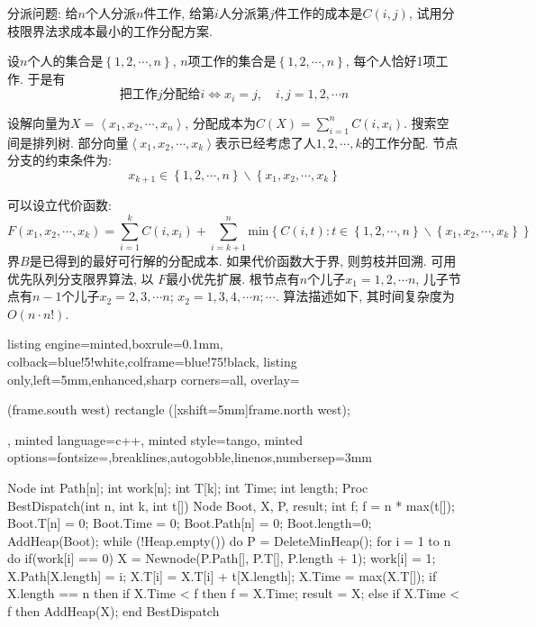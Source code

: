 \documentclass{article}
\begin{document}
\begin{homeworkProblem}
	分派问题: 给$n$个人分派$n$件工作, 给第$i$人分派第$j$件工作的成本是$C(i,j)$, 试用分枝限界法求成本最小的工作分配方案.

	\solution 设$n$个人的集合是$\left\{ 1,2,\cdots,n \right\}$, $n$项工作的集合是$\left\{ 1,2,\cdots,n \right\}$, 每个人恰好1项工作. 于是有
	$$\text{把工作}j\text{分配给}i\Leftrightarrow x_i=j,\quad i,j=1,2,\cdots n
	$$

	设解向量为$X=\left< x_1,x_2,\cdots ,x_n \right>	$, 分配成本为$\displaystyle C\left( X \right) =\sum_{i=1}^n{C\left( i,x_i \right)}	$. 搜索空间是排列树. 部分向量$\left< x_1,x_2,\cdots ,x_k \right> $表示已经考虑了人$1,2,\cdots,k$的工作分配. 节点分支的约束条件为:$$x_{k+1}\in \left\{ 1,2,\cdots ,n \right\} \backslash \left\{ x_1,x_2,\cdots ,x_k \right\} 
	$$

	可以设立代价函数:$$F\left( x_1,x_2,\cdots ,x_k \right) =\sum_{i=1}^k{C\left( i,x_i \right)}+\sum_{i=k+1}^n{\text{min} \left\{ C\left( i,t \right) :t\in \left\{ 1,2,\cdots ,n \right\} \backslash \left\{ x_1,x_2,\cdots ,x_k \right\} \right\}}
	$$
	界$B$是已得到的最好可行解的分配成本. 如果代价函数大于界, 则剪枝并回溯. 可用优先队列分支限界算法, 以
	$F$最小优先扩展. 根节点有$n$个儿子$x_1=1,2,\cdots n$, 儿子节点有$n-1$个儿子$x_2=2,3,\cdots n$; $x_2=1,3,4,\cdots n;\cdots $. 算法描述如下, 其时间复杂度为$O(n\cdot n!)$.
\begin{tcblisting}{listing engine=minted,boxrule=0.1mm,
colback=blue!5!white,colframe=blue!75!black,
listing only,left=5mm,enhanced,sharp corners=all,
overlay={\begin{tcbclipinterior} (frame.south west)
rectangle ([xshift=5mm]frame.north west);\end{tcbclipinterior}},
minted language=c++,
minted style=tango,
minted options={fontsize=\small,breaklines,autogobble,linenos,numbersep=3mm}}
Node{
    int Path[n];
    int work[n];
    int T[k];
    int Time;
    int length;
}
Proc BestDispatch(int n, int k, int t[]){
    Node Boot, X, P, result;
    int f;
    f = n * max(t[]);
    Boot.T[n] = {0};
    Boot.Time = 0;
    Boot.Path[n] = {0};
    Boot.length=0;
    AddHeap(Boot);
    while (!Heap.empty()) do {
        P = DeleteMinHeap();
        for i = 1 to n do {
            if(work[i] == 0) {
                X = Newnode(P.Path[], P.T[], P.length + 1);
                work[i] = 1;
            }
            X.Path[X.length] = i;
            X.T[i] = X.T[i] + t[X.length];
            X.Time = max(X.T[]);
            if X.length == n then {
                if X.Time < f then {
                    f = X.Time;
                    result = X;
                }
            }
            else {
                if X.Time < f then {
                    AddHeap(X);
                }
            }
        }
    }
}
end {BestDispatch}
\end{tcblisting}
\end{homeworkProblem}
\end{document}
